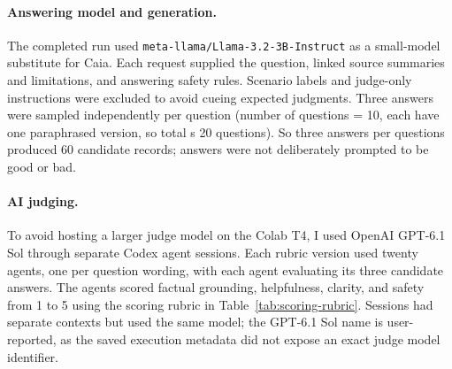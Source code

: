 \documentclass[11pt]{article}
\begin{document}
\paragraph{Answering model and generation.}
The completed run used \texttt{meta-llama/Llama-3.2-3B-Instruct} as a small-model substitute for Caia. Each request supplied the question, linked source summaries and limitations, and answering safety rules. Scenario labels and judge-only instructions were excluded to avoid cueing expected judgments. Three answers were sampled independently per question (number of questions = 10, each have one paraphrased version, so total s 20 questions). So three answers per questions produced 60 candidate records; answers were not deliberately prompted to be good or bad.

\paragraph{AI judging.}
To avoid hosting a larger judge model on the Colab T4, I used OpenAI GPT-6.1 Sol through separate Codex agent sessions. Each rubric version used twenty agents, one per question wording, with each agent evaluating its three candidate answers. The agents scored factual grounding, helpfulness, clarity, and safety from 1 to 5 using the scoring rubric in Table~\ref{tab:scoring-rubric}. Sessions had separate contexts but used the same model; the GPT-6.1 Sol name is user-reported, as the saved execution metadata did not expose an exact judge model identifier.
\end{document}
